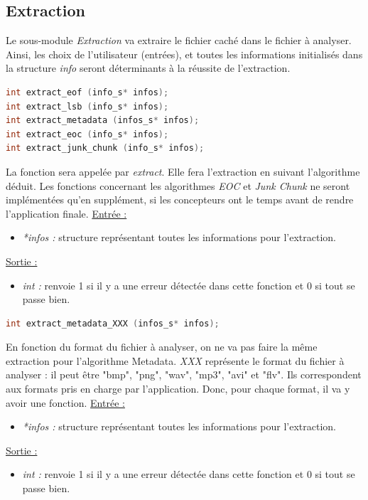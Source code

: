 \documentclass[11pt]{article}
\begin{document}
\subsection{Extraction}

Le sous-module \textit{Extraction} va extraire le fichier caché dans le 
fichier à analyser. Ainsi, les choix de l'utilisateur (entrées), et toutes les
informations initialisés dans la structure \textit{info} seront déterminants 
à la réussite de l'extraction. 

\begin{lstlisting}[language=c]
int extract_eof (info_s* infos); 
int extract_lsb (info_s* infos);
int extract_metadata (infos_s* infos);
int extract_eoc (info_s* infos);
int extract_junk_chunk (info_s* infos);
\end{lstlisting}

La fonction sera appelée par \textit{extract}.
Elle fera l'extraction en suivant l'algorithme déduit. 
Les fonctions concernant les algorithmes \textit{EOC} et \textit{Junk Chunk} 
ne seront implémentées qu'en supplément, si les concepteurs ont le temps 
avant de rendre l'application finale. 
\newline
\underline{Entrée :} 
\begin{itemize}
\item \textit{*infos :} structure représentant toutes les informations pour 
l'extraction.  
\end{itemize}
\underline{Sortie :} 
\begin{itemize}
\item \textit{int :} renvoie 1 si il y a une erreur détectée dans cette 
fonction et 0 si tout se passe bien.  
\newline 
\end{itemize}

\begin{lstlisting}[language=c]
int extract_metadata_XXX (infos_s* infos);
\end{lstlisting}

En fonction du format du fichier à analyser, on ne va pas faire la même 
extraction pour l'algorithme Metadata. 
\textit{XXX} représente le format du fichier à analyser : il peut être 
"bmp", "png", "wav", "mp3", "avi" et "flv". Ils correspondent aux formats 
pris en charge par l'application. Donc, pour chaque format, il va y avoir 
une fonction.  
\newline
\underline{Entrée :} 
\begin{itemize}
\item \textit{*infos :} structure représentant toutes les informations pour 
l'extraction. 
\end{itemize}
\underline{Sortie :} 
\begin{itemize}
\item \textit{int :} renvoie 1 si il y a une erreur détectée dans cette 
fonction et 0 si tout se passe bien.  
\newline 
\end{itemize}
\end{document}
